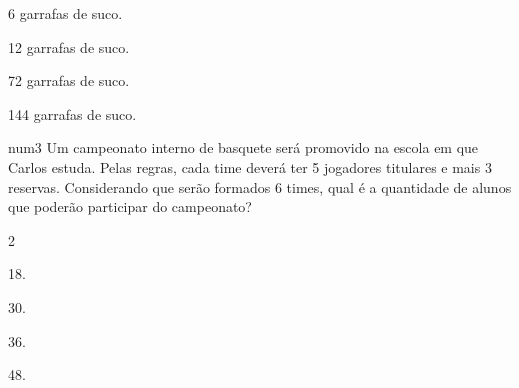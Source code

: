 6 garrafas de suco.

12 garrafas de suco.

72 garrafas de suco.

144 garrafas de suco.

num3 Um campeonato interno de basquete será promovido na escola em que
Carlos estuda. Pelas regras, cada time deverá ter 5 jogadores titulares
e mais 3 reservas. Considerando que serão formados 6 times, qual é a
quantidade de alunos que poderão participar do campeonato?

{}

2

18.

30.

36.

48.
